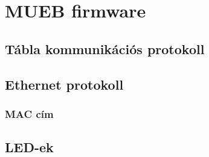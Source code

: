 \chapter{MUEB firmware}

\section{Tábla kommunikációs protokoll}
\section{Ethernet protokoll}
\subsection{MAC cím}
\section{LED-ek}
